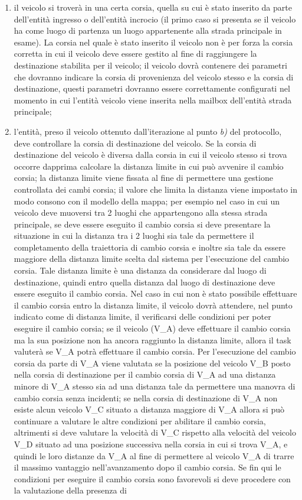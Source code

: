 \begin{enumerate}
\begin{enumerate}
\item il veicolo si troverà in una certa corsia, quella su cui è stato inserito da parte dell'entità ingresso o dell'entità incrocio (il primo caso si presenta se il veicolo ha come luogo di partenza un luogo appartenente alla strada principale in esame). La corsia nel quale è stato inserito il veicolo non è per forza la corsia corretta in cui il veicolo deve essere gestito al fine di raggiungere la destinazione stabilita per il veicolo; il veicolo dovrà contenere dei parametri che dovranno indicare la corsia di provenienza del veicolo stesso e la corsia di destinazione, questi parametri dovranno essere correttamente configurati nel momento in cui l'entità veicolo viene inserita nella mailbox dell'entità strada principale;
\item l'entità, preso il veicolo ottenuto dall'iterazione al punto \textit{b)} del protocollo, deve controllare la corsia di destinazione del veicolo. Se la corsia di destinazione del veicolo è diversa dalla corsia in cui il veicolo stesso si trova occorre dapprima calcolare la distanza limite in cui può avvenire il cambio corsia; la distanza limite viene fissata al fine di permettere una gestione controllata dei cambi corsia; il valore che limita la distanza viene impostato in modo consono con il modello della mappa; per esempio nel caso in cui un veicolo deve muoversi tra 2 luoghi che appartengono alla stessa strada principale, se deve essere eseguito il cambio corsia si deve presentare la situazione in cui la distanza tra i 2 luoghi sia tale da permettere il completamento della traiettoria di cambio corsia e inoltre sia tale da essere maggiore della distanza limite scelta dal sistema per l'esecuzione del cambio corsia. Tale distanza limite è una distanza da considerare dal luogo di destinazione, quindi entro quella distanza dal luogo di destinazione deve essere eseguito il cambio corsia. Nel caso in cui non è stato possibile effettuare il cambio corsia entro la distanza limite, il veicolo dovrà attendere, nel punto indicato come di distanza limite, il verificarsi delle condizioni per poter eseguire il cambio corsia; se il veicolo (V\_A) deve effettuare il cambio corsia ma la sua posizione non ha ancora raggiunto la distanza limite, allora il task valuterà se V\_A potrà effettuare il cambio corsia. Per l'esecuzione del cambio corsia da parte di V\_A viene valutata se la posizione del veicolo V\_B posto nella corsia di destinazione per il cambio corsia di V\_A ad una distanza minore di V\_A stesso sia ad una distanza tale da permettere una manovra di cambio corsia senza incidenti; se nella corsia di destinazione di V\_A non esiste alcun veicolo V\_C situato a distanza maggiore di V\_A allora si può continuare a valutare le altre condizioni per abilitare il cambio corsia, altrimenti si deve valutare la velocità di V\_C rispetto alla velocità del veicolo V\_D situato ad una posizione successiva nella corsia in cui si trova V\_A, e quindi le loro distanze da V\_A al fine di permettere al veicolo V\_A di trarre il massimo vantaggio nell'avanzamento dopo il cambio corsia. Se fin qui le condizioni per eseguire il cambio corsia sono favorevoli si deve procedere con la valutazione della presenza di 
\end{enumerate}
\end{enumerate}
